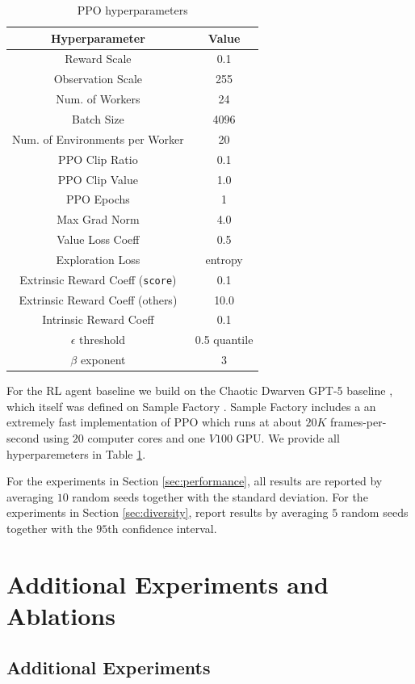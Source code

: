 \documentclass{article} %
\begin{document}
\begin{table}[ht]
\centering
\caption{PPO hyperparameters}
\label{tab:hyperparameters}
\begin{tabular}{cc}
\toprule
Hyperparameter & Value \\
\midrule
Reward Scale & 0.1 \\
Observation Scale & 255 \\
Num. of Workers & 24 \\
Batch Size & 4096 \\
Num. of Environments per Worker & 20 \\
PPO Clip Ratio & 0.1 \\
PPO Clip Value & 1.0 \\
PPO Epochs & 1 \\
Max Grad Norm & 4.0 \\
Value Loss Coeff & 0.5 \\
Exploration Loss & entropy \\
Extrinsic Reward Coeff (\texttt{score}) & 0.1 \\
Extrinsic Reward Coeff (others) & 10.0 \\
Intrinsic Reward Coeff & 0.1 \\
$\epsilon$ threshold & 0.5 quantile \\
$\beta$ exponent & 3 \\
\bottomrule
\end{tabular}
\end{table}
For the RL agent baseline we build on the Chaotic Dwarven GPT-5 baseline \citep{miffyli2022}, which itself was defined on Sample Factory \citep{petrenko2020sf}. Sample Factory includes a an extremely fast implementation of PPO \citep{schulman2017proximal} which runs at about $20K$ frames-per-second using $20$ computer cores and one $V100$ GPU. We provide all hyperparemeters in Table \ref{tab:hyperparameters}.

For the experiments in Section \ref{sec:performance}, all results are reported by averaging $10$ random seeds together with the standard deviation. For the experiments in Section \ref{sec:diversity}, report results by averaging $5$ random seeds together with the $95$th confidence interval.  


\section{Additional Experiments and Ablations}
\label{appendix:additional-experiments}

\subsection{Additional Experiments}
\end{document}
